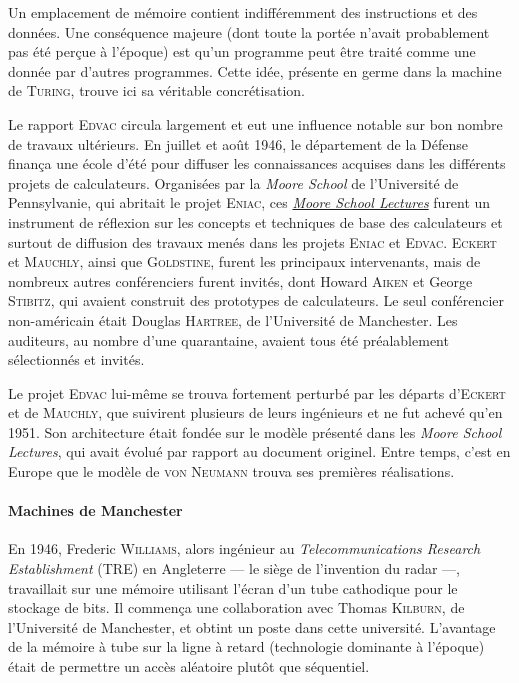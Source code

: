 Un emplacement de mémoire contient indifféremment des instructions et des données. Une conséquence majeure (dont toute la portée n’avait probablement pas été perçue à l’époque) est qu’un programme peut être traité comme une donnée par d’autres programmes. Cette idée, présente en germe dans la machine de \textsc{Turing}, trouve ici sa véritable concrétisation.


Le rapport \textsc{Edvac} circula largement et eut une influence notable sur bon nombre de travaux ultérieurs. En juillet et août 1946, le département de la Défense finança une école d’été pour diffuser les connaissances acquises dans les différents projets de calculateurs. Organisées par la \textit{Moore School} de l’Université de Pennsylvanie, qui abritait le projet \textsc{Eniac}, ces \href{https://en.wikipedia.org/wiki/Moore_School_Lectures}{\textit{Moore School Lectures}} furent un instrument de réflexion sur les concepts et techniques de base des calculateurs et surtout de diffusion des travaux menés dans les projets \textsc{Eniac} et \textsc{Edvac}. \textsc{Eckert} et \textsc{Mauchly}, ainsi que \textsc{Goldstine}, furent les principaux intervenants, mais de nombreux autres conférenciers furent invités, dont Howard \textsc{Aiken} et George \textsc{Stibitz}, qui avaient construit des prototypes de calculateurs. Le seul conférencier non-américain était Douglas \textsc{Hartree}, de l’Université de Manchester. Les auditeurs, au nombre d’une quarantaine, avaient tous été préalablement sélectionnés et invités.

Le projet \textsc{Edvac} lui-même se trouva fortement perturbé par les départs d’\textsc{Eckert} et de \textsc{Mauchly}, que suivirent plusieurs de leurs ingénieurs et ne fut achevé qu’en 1951. Son architecture était fondée sur le modèle présenté dans les \textit{Moore School Lectures}, qui avait évolué par rapport au document originel. 
Entre temps, c’est en Europe que le modèle de \textsc{von Neumann} trouva ses premières réalisations.

\paragraph*{Machines de Manchester}
En 1946, Frederic \textsc{Williams}, alors ingénieur au \textit{Telecommunications Research Establishment} (TRE) en Angleterre --- le siège de l’invention du radar ---, travaillait sur une mémoire utilisant l’écran d’un tube cathodique pour le stockage de bits. Il commença une collaboration avec Thomas \textsc{Kilburn}, de l’Université de Manchester, et obtint un poste dans cette université. L’avantage de la mémoire à tube sur la ligne à retard (technologie dominante à l’époque) était de permettre un accès aléatoire plutôt que séquentiel.

